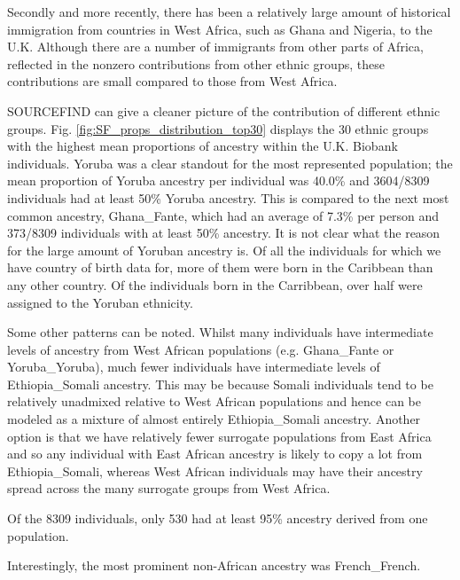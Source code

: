 Secondly and more recently, there has been a relatively large amount of historical immigration from countries in West Africa, such as Ghana and Nigeria, to the U.K. Although there are a number of immigrants from other parts of Africa, reflected in the nonzero contributions from other ethnic groups, these contributions are small compared to those from West Africa.

SOURCEFIND can give a cleaner picture of the contribution of different ethnic groups. Fig. \ref{fig:SF_props_distribution_top30} displays the 30 ethnic groups with the highest mean proportions of ancestry within the U.K. Biobank individuals. Yoruba was a clear standout for the most represented population; the mean proportion of Yoruba ancestry per individual was 40.0\% and 3604/8309 individuals had at least 50\% Yoruba ancestry. This is compared to the next most common ancestry, Ghana\_Fante, which had an average of 7.3\% per person and 373/8309 individuals with at least 50\% ancestry. It is not clear what the reason for the large amount of Yoruban ancestry is. Of all the individuals for which we have country of birth data for, more of them were born in the Caribbean than any other country. Of the individuals born in the Carribbean, over half were assigned to the Yoruban ethnicity.    

Some other patterns can be noted. Whilst many individuals have intermediate levels of ancestry from West African populations (e.g. Ghana\_Fante or Yoruba\_Yoruba), much fewer individuals have intermediate levels of Ethiopia\_Somali ancestry. This may be because Somali individuals tend to be relatively unadmixed relative to West African populations and hence can be modeled as a mixture of almost entirely Ethiopia\_Somali ancestry. Another option is that we have relatively fewer surrogate populations from East Africa and so any individual with East African ancestry is likely to copy a lot from Ethiopia\_Somali, whereas West African individuals may have their ancestry spread across the many surrogate groups from West Africa. 

Of the 8309 individuals, only 530 had at least 95\% ancestry derived from one population. 

Interestingly, the most prominent non-African ancestry was French\_French. 




